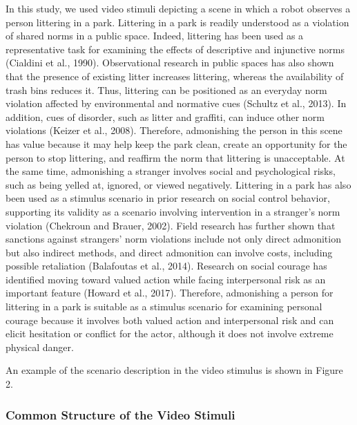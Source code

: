 In this study, we used video stimuli depicting a scene in which a robot
observes a person littering in a park. Littering in a park is readily
understood as a violation of shared norms in a public space. Indeed,
littering has been used as a representative task for examining the
effects of descriptive and injunctive norms (Cialdini et al., 1990).
Observational research in public spaces has also shown that the presence
of existing litter increases littering, whereas the availability of
trash bins reduces it. Thus, littering can be positioned as an everyday
norm violation affected by environmental and normative cues (Schultz et
al., 2013). In addition, cues of disorder, such as litter and graffiti,
can induce other norm violations (Keizer et al., 2008). Therefore,
admonishing the person in this scene has value because it may help keep
the park clean, create an opportunity for the person to stop littering,
and reaffirm the norm that littering is unacceptable. At the same time,
admonishing a stranger involves social and psychological risks, such as
being yelled at, ignored, or viewed negatively. Littering in a park has
also been used as a stimulus scenario in prior research on social
control behavior, supporting its validity as a scenario involving
intervention in a stranger's norm violation (Chekroun and Brauer, 2002).
Field research has further shown that sanctions against strangers' norm
violations include not only direct admonition but also indirect methods,
and direct admonition can involve costs, including possible retaliation
(Balafoutas et al., 2014). Research on social courage has identified
moving toward valued action while facing interpersonal risk as an
important feature (Howard et al., 2017). Therefore, admonishing a person
for littering in a park is suitable as a stimulus scenario for examining
personal courage because it involves both valued action and
interpersonal risk and can elicit hesitation or conflict for the actor,
although it does not involve extreme physical danger.

An example of the scenario description in the video stimulus is shown in
Figure 2.

\subsubsection{Common Structure of the Video
Stimuli}\label{common-structure-of-the-video-stimuli}

